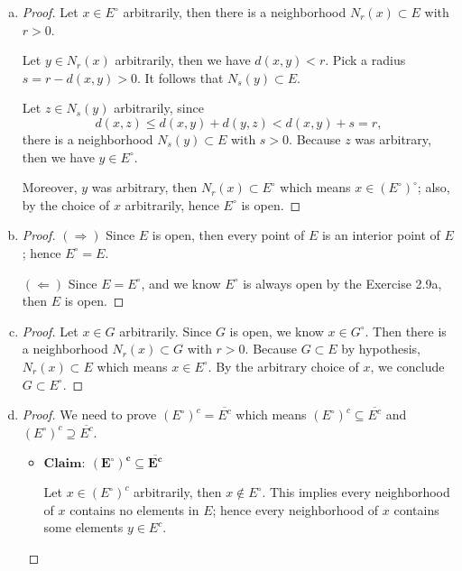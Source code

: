 \begin{Exercise}
	\begin{enumerate}[a)]
		\item
		\begin{proof}
			Let $x\in E^{\circ}$ arbitrarily, then there is a neighborhood $N_r(x)\subset E$ with $r>0$.
			
			Let $y\in N_r(x)$ arbitrarily, then we have $d(x,y)<r$. 
			Pick a radius $s=r-d(x,y)>0$. It follows that $N_s(y)\subset E$. 
			
			Let $z\in N_s(y)$ arbitrarily, since
			$$
			d(x,z) \leq d(x,y)+d(y,z) < d(x,y) + s = r,
			$$
			there is a neighborhood $N_s(y)\subset E$ with $s>0$. 
			Because $z$ was arbitrary, then we have $y\in E^{\circ}$.
			
			Moreover, $y$ was arbitrary, then $N_r(x)\subset E^{\circ}$ which means $x\in (E^{\circ})^{\circ}$; also, by the choice of $x$ arbitrarily, hence $E^{\circ}$ is open.
		\end{proof}
		
		\item
		\begin{proof}
			$(\Longrightarrow)$
			Since $E$ is open, then every point of $E$ is an interior point of $E$; hence $E^{\circ} = E$.
			
			$(\Longleftarrow)$
			Since $E = E^{\circ}$, and we know $E^{\circ}$ is always open by the Exercise 2.9a, then $E$ is open.
		\end{proof}
		
		\item
		\begin{proof}
			Let $x\in G$ arbitrarily. 
			Since $G$ is open, we know $x\in G^{\circ}$. 
			Then there is a neighborhood $N_r(x)\subset G$ with $r>0$. 
			Because $G\subset E$ by hypothesis, $N_r(x)\subset E$ which means $x\in E^{\circ}$. 
			By the arbitrary choice of $x$, we conclude $G\subset E^{\circ}$.
		\end{proof}
		
		\item
		\begin{proof}
			We need to prove $(E^{\circ})^c = \overline{E^c}$ which means $(E^{\circ})^c \subseteq \overline{E^c}$ and $(E^{\circ})^c \supseteq \overline{E^c}$.
			
			\begin{itemize}
				\item $\mathbf{Claim:\ (E^{\circ})^c \subseteq \overline{E^c}}$
				
				Let $x\in(E^{\circ})^c$ arbitrarily, then $x\notin E^{\circ}$.
				This implies every neighborhood of $x$ contains no elements in $E$; hence every neighborhood of $x$ contains some elements $y\in E^c$.
				

\end{itemize}
\end{proof}
\end{enumerate}
\end{Exercise}
